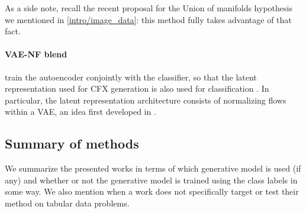 \documentclass[../main.tex]{subfiles}
\begin{document}
As a side note, recall the recent proposal for the Union of manifolds hypothesis \cite{brownUnion2022} we mentioned in
\autoref{intro/image_data}: this method fully takes advantage of that fact.

\paragraph{VAE-NF blend}

\citeauthor{zhangInterpretable2022} train the autoencoder conjointly with the classifier, so that the latent representation used for CFX generation is also used for classification \cite{zhangInterpretable2022}.
In particular, the latent representation architecture consists of normalizing flows within a VAE, an idea first developed in \cite{rezendeVariational2015}.

\subsection{Summary of methods}

We summarize the presented works in terms of which generative model is used (if any) and whether or not the generative model
is trained using the class labels in some way.
We also mention when a work does not specifically target or test their method on tabular data problems.
\end{document}

